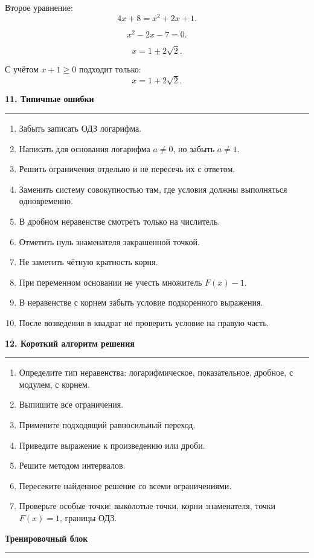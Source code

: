 \documentclass[a4paper,12pt]{article}
\newcommand{\SectionTitle}[1]{%
  \vspace{0.8em}
  {\Large\bfseries\textcolor{darkaccent}{#1}}\par
  \vspace{0.2em}
  {\color{accent}\rule{\linewidth}{0.8pt}}
  \vspace{0.4em}
}
\begin{document}
Второе уравнение:
\[
4x+8=x^2+2x+1.
\]

\[
x^2-2x-7=0.
\]

\[
x=1\pm2\sqrt2.
\]

С учётом \(x+1\ge0\) подходит только:
\[
x=1+2\sqrt2.
\]

\SectionTitle{11. Типичные ошибки}

\begin{enumerate}
\item Забыть записать ОДЗ логарифма.
\item Написать для основания логарифма \(a\ne0\), но забыть \(a\ne1\).
\item Решить ограничения отдельно и не пересечь их с ответом.
\item Заменить систему совокупностью там, где условия должны выполняться одновременно.
\item В дробном неравенстве смотреть только на числитель.
\item Отметить нуль знаменателя закрашенной точкой.
\item Не заметить чётную кратность корня.
\item При переменном основании не учесть множитель \(F(x)-1\).
\item В неравенстве с корнем забыть условие подкоренного выражения.
\item После возведения в квадрат не проверить условие на правую часть.
\end{enumerate}

\SectionTitle{12. Короткий алгоритм решения}

\begin{enumerate}
\item Определите тип неравенства: логарифмическое, показательное, дробное, с модулем, с корнем.
\item Выпишите все ограничения.
\item Примените подходящий равносильный переход.
\item Приведите выражение к произведению или дроби.
\item Решите методом интервалов.
\item Пересеките найденное решение со всеми ограничениями.
\item Проверьте особые точки: выколотые точки, корни знаменателя, точки \(F(x)=1\), границы ОДЗ.
\end{enumerate}

\newpage

\SectionTitle{Тренировочный блок}
\end{document}
